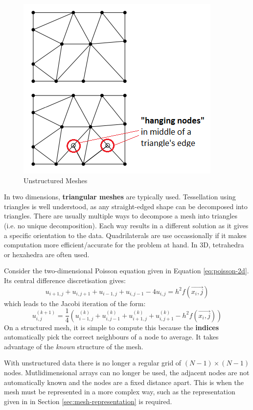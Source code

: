 \documentclass{article}
\begin{document}
\begin{figure}
	\centering
	\includegraphics[scale=0.5]{figures/unstructured-mesh-examples.png}
	\caption{Unstructured Meshes}
	\label{fig:unstructured-meshes}
\end{figure}

In two dimensions, \textbf{triangular meshes} are typically used. Tessellation using triangles is well understood, as any straight-edged shape can be decomposed into triangles. There are usually multiple ways to decompose a mesh into triangles (i.e. no unique decomposition). Each way results in a different solution as it gives a specific orientation to the data. Quadrilaterals are use occassionally if it makes computation more efficient/accurate for the problem at hand. In 3D, tetrahedra or hexahedra are often used.

Consider the two-dimensional Poisson equation given in Equation \ref{eq:poisson-2d}. Its central difference discretisation gives:
\begin{equation}
u_{i+1,j} + u_{i,j+1} + u_{i-1,j} + u_{i,j-1} - 4u_{i,j} = h^2f(\vec{x_i,j})
\end{equation}
which leads to the Jacobi iteration of the form:
\begin{equation}
u_{i,j}^{(k+1)} = \frac{1}{4} \left( u_{i-1,j}^{(k)} + u_{i,j-1}^{(k)} + u_{i+1,j}^{(k)} + u_{i,j+1}^{(k)} - h^2f(\vec{x_i,j}) \right)
\end{equation}
On a structured mesh, it is simple to compute this because the \textbf{indices} automatically pick the correct neighbours of a node to average. It takes advantage of the \textit{known} structure of the mesh.

With unstructured data there is no longer a regular grid of $(N - 1) \times (N - 1)$ nodes. Mutlidimensional arrays can no longer be used, the adjacent nodes are not automatically known and the nodes are a fixed distance apart. This is when the mesh must be represented in a more complex way, such as the representation given in in Section \ref{sec:mesh-representation} is required.
\end{document}
